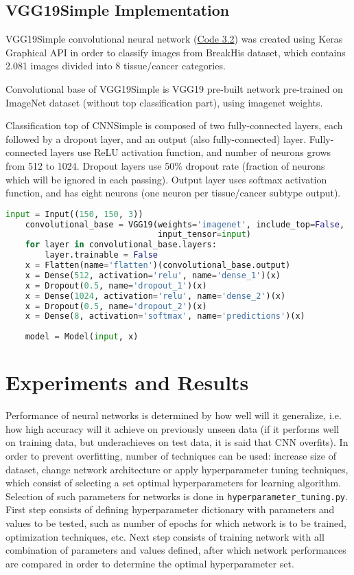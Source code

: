 \subsection{VGG19Simple Implementation}

VGG19Simple convolutional neural network (\textcolor{red}{\hyperref[src:py2]{Code 3.2}}) was created using Keras Graphical API in order to classify images from BreakHis dataset, which contains 2.081 images divided into 8 tissue/cancer categories. 

Convolutional base of VGG19Simple is VGG19 pre-built network pre-trained on ImageNet dataset (without top classification part), using imagenet weights.

Classification top of CNNSimple is composed of two fully-connected layers, each followed by a dropout layer, and an output (also fully-connected) layer. Fully-connected layers use ReLU activation function, and number of neurons grows from 512 to 1024. Dropout layers use 50\% dropout rate (fraction of neurons which will be ignored in each passing). Output layer uses softmax activation function, and has eight neurons (one neuron per tissue/cancer subtype output). 

\vspace{3mm}
\begin{lstlisting}[language={Python}, basicstyle=\scriptsize]
	input = Input((150, 150, 3))
	convolutional_base = VGG19(weights='imagenet', include_top=False,
	                           input_tensor=input)
	for layer in convolutional_base.layers:
		layer.trainable = False
	x = Flatten(name='flatten')(convolutional_base.output)
	x = Dense(512, activation='relu', name='dense_1')(x)
	x = Dropout(0.5, name='dropout_1')(x)
	x = Dense(1024, activation='relu', name='dense_2')(x)
	x = Dropout(0.5, name='dropout_2')(x)
	x = Dense(8, activation='softmax', name='predictions')(x)
	
	model = Model(input, x)
\end{lstlisting} 

\section{Experiments and Results}
\label{exp}

Performance of neural networks is determined by how well will it generalize, i.e. how high accuracy will it achieve on previously unseen data (if it performs well on training data, but underachieves on test data, it is said that CNN overfits). In order to prevent overfitting, number of techniques can be used: increase size of dataset, change network architecture or apply hyperparameter tuning techniques, which consist of selecting a set optimal hyperparameters for learning algorithm. Selection of such parameters for networks is done in \texttt{hyperparameter\_tuning.py}. First step consists of defining hyperparameter dictionary with parameters and values to be tested, such as number of epochs for which network is to be trained, optimization techniques, etc. Next step consists of training network with all combination of parameters and values defined, after which network performances are compared in order to determine the optimal hyperparameter set.

